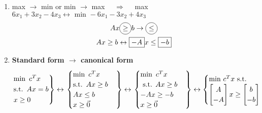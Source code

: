\begin{enumerate}
\item max $\rightarrow$ min \quad or \quad min $\rightarrow$ max $\quad \Longrightarrow \quad$ max $6x_1 + 3x_2 - 4x_3 \leftrightarrow \text{ min } -6x_1 - 3x_2 + 4x_3$
\begin{gather*}
	Ax \circled{$\geq$} b \rightarrow \circled{$\leq$} \\
	Ax \geq b \leftrightarrow \boxed{-A}x \leq \boxed{-b}
\end{gather*}
\item \textbf{Standard form $\rightarrow$ canonical form}
\begin{gather*}
\begin{rcases}
	\text{min} \hspace{0.5em}  c^Tx \hspace{0.5em} \\ \text{s.t.} \hspace{0.5em} Ax = b\\
	x \geq 0
\end{rcases}
\leftrightarrow 
\begin{rcases}
	\begin{cases}
	\text{min} \hspace{0.5em} c^Tx \hspace{0.5em} \\ \text{s.t.} \hspace{0.5em}Ax \geq b\\
Ax \leq b\\
x \geq \vec{0}
\end{cases}
\end{rcases} \leftrightarrow
\begin{rcases}
	\begin{cases}
	\text{min} \hspace{0.5em} c^Tx \\ \text{ s.t. } Ax \geq b\\
	-Ax \geq -b\\
	x \geq \vec{0}
\end{cases}
\end{rcases} \leftrightarrow
\begin{cases}
	\text{min } c^Tx \text{ s.t. }\\
	\begin{bmatrix}
		A\\
		-A
	\end{bmatrix} x \geq 
	\begin{bmatrix}
		b\\-b
	\end{bmatrix}\\

\end{cases}
\end{gather*}
\end{enumerate}
